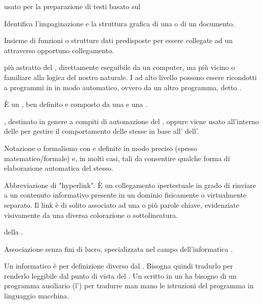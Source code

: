

{ usato per la preparazione di testi basato sul  }


{Identifica l'impaginazione e la struttura grafica di una  o di un documento.}


{Insieme di funzioni o strutture dati predisposte per essere collegate ad un   attraverso opportuno collegamento.}


{ più astratto del , direttamente eseguibile da un computer, ma più vicino o familiare alla logica del nostro  naturale. I  ad alto livello possono essere ricondotti a programmi in  in modo automatico, ovvero da un altro programma, detto .}


{\`{E} un , ben definito e composto da una  e una .}


{, destinato in genere a compiti di automazione del , oppure viene usato all'interno delle  per gestire il comportamento delle  stesse in base all'  dell'.}


{Notazione o formalismo con  e  definite in modo preciso (spesso matematico/formale) e, in molti casi, tali da consentire qualche forma di elaborazione automatica del  stesso.}


{Abbreviazione di "hyperlink". \`{E} un collegamento ipertestuale in grado di rinviare a un contenuto informativo presente in un dominio fisicamente o virtualmente separato. Il link è di solito associato ad una o più parole chiave, evidenziate visivamente da una diversa colorazione o sottolineatura.}


{ della .}


{Associazione senza fini di lucro, specializzata nel campo dell'informatica .}


{Un  informatico è per definizione diverso dal . Bisogna quindi tradurlo per renderlo leggibile dal punto di vista del . Un  scritto in un  ha bisogno di un programma ausiliario (l') per tradurre man mano le istruzioni del programma in linguaggio macchina.}


